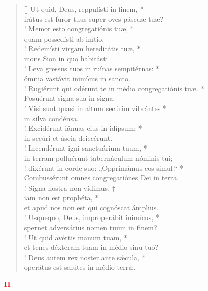 \begin{verse}[\versewidth]
Ut quid, Deus, reppulísti in finem, *\\
irátus est furor tuus super oves páscuæ tuæ?\\!
\vin Memor esto congregatiónis tuæ, *\\
\vin quam possedísti ab inítio.\\!
Redemísti virgam hereditátis tuæ, *\\
mons Sion in quo habitásti.\\!
\vin Leva gressus tuos in ruínas sempitérnas: *\\
\vin ómnia vastávit inimícus in sancto.\\!
Rugiérunt qui odérunt te in médio congregatiónis tuæ. *\\
Posuérunt signa sua in signa.\\!
\vin Visi sunt quasi in altum secúrim vibrántes *\\
\vin in silva condénsa.\\!
Excidérunt iánuas eius in idípsum; *\\
in secúri et áscia deiecérunt.\\!
\vin Incendérunt igni sanctuárium tuum, *\\
\vin in terram polluérunt tabernáculum nóminis tui;\\!
dixérunt in corde suo: „Opprimámus eos simul.“ *\\
Combussérunt omnes congregatiónes Dei in terra.\\!
\vin Signa nostra non vídimus, †\\
\vin iam non est prophéta, *\\
\vin et apud nos non est qui cognóscat ámplius.\\!
Usquequo, Deus, improperábit inimícus, *\\
spernet adversárius nomen tuum in finem?\\!
\vin Ut quid avértis manum tuam, *\\
\vin et tenes déxteram tuam in médio sinu tuo?\\!
Deus autem rex noster ante s\'{æ}cula, *\\
operátus est salútes in médio terræ.\\
\end{verse}
\begin{center}
\textcolor{red}{\bf II}
\end{center}
